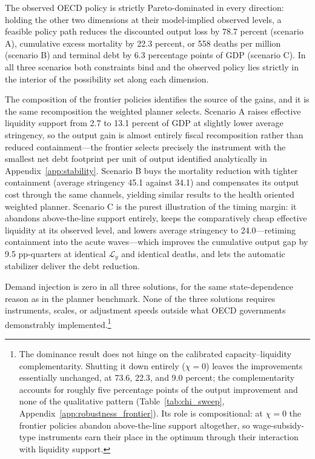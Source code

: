 \documentclass[12pt, a4paper]{article}
\begin{document}
\noindent The observed OECD policy is strictly Pareto-dominated in every direction: holding the other two dimensions at their model-implied observed levels, a feasible policy path reduces the discounted output loss by 78.7 percent (scenario A), cumulative excess mortality by 22.3 percent, or 558 deaths per million (scenario B) and terminal debt by 6.3 percentage points of GDP (scenario C). In all three scenarios both constraints bind and the observed policy lies strictly in the interior of the possibility set along each dimension.

The composition of the frontier policies identifies the source of the gains, and it is the same recomposition the weighted planner selects. Scenario A raises effective liquidity support from 2.7 to 13.1 percent of GDP at slightly lower average stringency, so the output gain is almost entirely fiscal recomposition rather than reduced containment---the frontier selects precisely
the instrument with the smallest net debt footprint per unit of output identified analytically in Appendix~\ref{app:stability}. Scenario B buys the mortality reduction with tighter containment (average stringency 45.1 against 34.1) and compensates its output cost through the same channels, yielding similar results to the health oriented weighted planner. Scenario C is the purest illustration of the timing margin: it abandons above-the-line support entirely, keeps the comparatively cheap effective liquidity at its observed level, and lowers average stringency to 24.0---retiming containment into the acute waves---which improves the cumulative output gap by 9.5
pp-quarters at identical \(\mathcal{L}_y\) and identical deaths, and lets the automatic stabilizer deliver the debt reduction. 

Demand injection is zero in all three solutions, for the same state-dependence reason as in the planner benchmark. None of the three solutions requires instruments, scales, or adjustment speeds outside what OECD governments demonstrably implemented.\footnote{The dominance result does not hinge on the calibrated capacity--liquidity complementarity. Shutting it down
entirely (\(\chi = 0\)) leaves the improvements essentially unchanged, at
73.6, 22.3, and 9.0 percent; the complementarity accounts for roughly five
percentage points of the output improvement and none of the qualitative
pattern (Table~\ref{tab:chi_sweep}, Appendix~\ref{app:robustness_frontier}).
Its role is compositional: at \(\chi = 0\) the frontier policies abandon
above-the-line support altogether, so wage-subsidy-type instruments earn their
place in the optimum through their interaction with liquidity support.}
\end{document}
